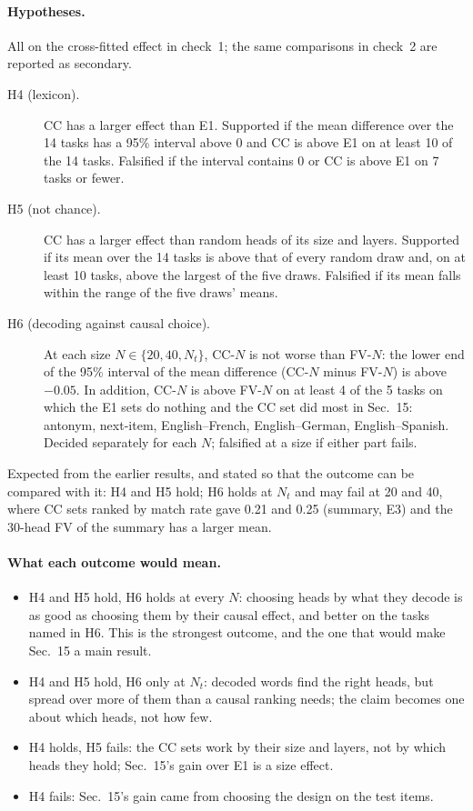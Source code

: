 \paragraph{Hypotheses.} All on the cross-fitted effect in check~1; the same comparisons in
check~2 are reported as secondary.
\begin{description}
  \item[H4 (lexicon).] CC has a larger effect than E1. Supported if the mean difference over
    the 14 tasks has a 95\% interval above 0 and CC is above E1 on at least 10 of the 14 tasks.
    Falsified if the interval contains 0 or CC is above E1 on 7 tasks or fewer.
  \item[H5 (not chance).] CC has a larger effect than random heads of its size and layers.
    Supported if its mean over the 14 tasks is above that of every random draw and, on at
    least 10 tasks, above the largest of the five draws. Falsified if its mean falls within the
    range of the five draws' means.
  \item[H6 (decoding against causal choice).] At each size $N \in \{20, 40, N_t\}$, CC-$N$
    is not worse than FV-$N$: the lower end of the 95\% interval of the mean difference
    (CC-$N$ minus FV-$N$) is above $-0.05$. In addition, CC-$N$ is above FV-$N$ on at least
    4 of the 5 tasks on which the E1 sets do nothing and the CC set did most in Sec.~15:
    antonym, next-item, English--French, English--German, English--Spanish. Decided
    separately for each $N$; falsified at a size if either part fails.
\end{description}
Expected from the earlier results, and stated so that the outcome can be compared with it:
H4 and H5 hold; H6 holds at $N_t$ and may fail at 20 and 40, where CC sets ranked by match
rate gave 0.21 and 0.25 (summary, E3) and the 30-head FV of the summary has a larger mean.

\paragraph{What each outcome would mean.}
\begin{itemize}
  \item H4 and H5 hold, H6 holds at every $N$: choosing heads by what they decode is as
    good as choosing them by their causal effect, and better on the tasks named in H6. This
    is the strongest outcome, and the one that would make Sec.~15 a main result.
  \item H4 and H5 hold, H6 only at $N_t$: decoded words find the right heads, but spread
    over more of them than a causal ranking needs; the claim becomes one about which heads,
    not how few.
  \item H4 holds, H5 fails: the CC sets work by their size and layers, not by which heads
    they hold; Sec.~15's gain over E1 is a size effect.
  \item H4 fails: Sec.~15's gain came from choosing the design on the test items.
\end{itemize}

